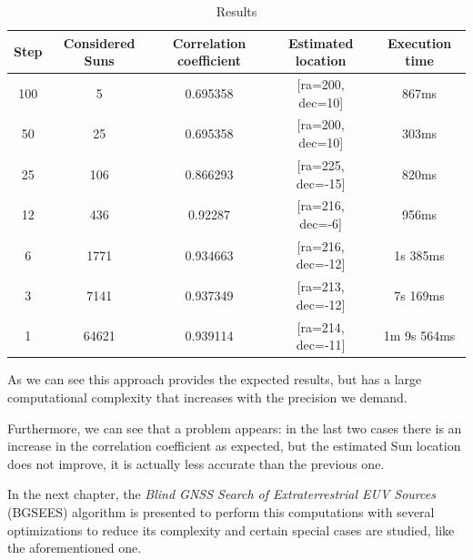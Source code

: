 \begin{table}[h!]
	\centering
	\def\arraystretch{1.2}
	\begin{tabular}{|c c c c c|} 
		\hline
		Step & Considered Suns & Correlation coefficient & Estimated location & Execution time \\ [0.5ex] 
		\hline\hline
		100 & 5 & 0.695358 & [ra=200, dec=10] & 867ms \\
		\hline 
		50 & 25 & 0.695358 & [ra=200, dec=10] & 303ms \\
			\hline 
		25 & 106 & 0.866293 & [ra=225, dec=-15] & 820ms \\
			\hline 
		12 & 436 & 0.92287 & [ra=216, dec=-6] & 956ms \\
			\hline 
		6 & 1771 & 0.934663 & [ra=216, dec=-12] & 1s 385ms \\
			\hline 
		3 & 7141 & 0.937349 & [ra=213, dec=-12] & 7s 169ms \\
			\hline 
		1 & 64621 & 0.939114 & [ra=214, dec=-11] & 1m 9s 564ms \\
		\hline 
		\hline 
	\end{tabular}
	\caption{Results}
\end{table}

As we can see this approach provides the expected results, but has a large computational complexity that increases with the precision we demand. 

Furthermore, we can see that a problem appears: in the last two cases there is an increase in the correlation coefficient as expected, but the estimated Sun location does not improve, it is actually less accurate than the previous one.

In the next chapter, the \textit{Blind GNSS Search of Extraterrestrial EUV Sources} (BGSEES) algorithm is presented to perform this computations with several optimizations to reduce its complexity and certain special cases are studied, like the aforementioned one.
